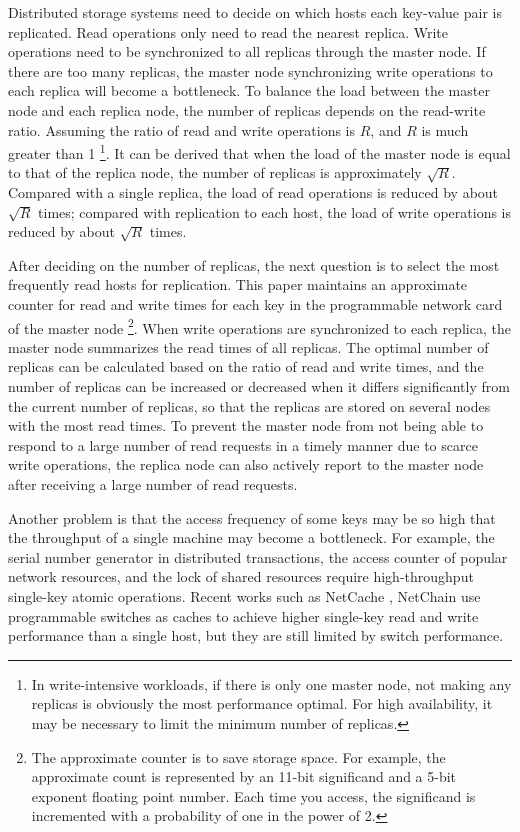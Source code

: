Distributed storage systems need to decide on which hosts each key-value pair is replicated. Read operations only need to read the nearest replica. Write operations need to be synchronized to all replicas through the master node. If there are too many replicas, the master node synchronizing write operations to each replica will become a bottleneck. To balance the load between the master node and each replica node, the number of replicas depends on the read-write ratio. Assuming the ratio of read and write operations is $R$, and $R$ is much greater than 1 \footnote{In write-intensive workloads, if there is only one master node, not making any replicas is obviously the most performance optimal. For high availability, it may be necessary to limit the minimum number of replicas.}. It can be derived that when the load of the master node is equal to that of the replica node, the number of replicas is approximately $\sqrt{R}$. Compared with a single replica, the load of read operations is reduced by about $\sqrt{R}$ times; compared with replication to each host, the load of write operations is reduced by about $\sqrt{R}$ times.

After deciding on the number of replicas, the next question is to select the most frequently read hosts for replication. This paper maintains an approximate counter for read and write times for each key in the programmable network card of the master node \footnote{The approximate counter is to save storage space. For example, the approximate count is represented by an 11-bit significand and a 5-bit exponent floating point number. Each time you access, the significand is incremented with a probability of one in the power of 2.}. When write operations are synchronized to each replica, the master node summarizes the read times of all replicas. The optimal number of replicas can be calculated based on the ratio of read and write times, and the number of replicas can be increased or decreased when it differs significantly from the current number of replicas, so that the replicas are stored on several nodes with the most read times. To prevent the master node from not being able to respond to a large number of read requests in a timely manner due to scarce write operations, the replica node can also actively report to the master node after receiving a large number of read requests.

Another problem is that the access frequency of some keys may be so high that the throughput of a single machine may become a bottleneck. For example, the serial number generator in distributed transactions, the access counter of popular network resources, and the lock of shared resources require high-throughput single-key atomic operations. Recent works such as NetCache \cite{netcache-sosp17}, NetChain \cite{jin2018netchain} use programmable switches as caches to achieve higher single-key read and write performance than a single host, but they are still limited by switch performance.

